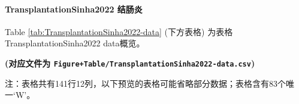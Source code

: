 \documentclass[
]{article}
\begin{document}
\hypertarget{transplantationsinha2022-ux7ed3ux80a0ux708e}{%
\paragraph{TransplantationSinha2022 结肠炎}\label{transplantationsinha2022-ux7ed3ux80a0ux708e}}

Table \ref{tab:TransplantationSinha2022-data} (下方表格) 为表格TransplantationSinha2022 data概览。

\textbf{(对应文件为 \texttt{Figure+Table/TransplantationSinha2022-data.csv})}

\begin{center}\begin{tcolorbox}[colback=gray!10, colframe=gray!50, width=0.9\linewidth, arc=1mm, boxrule=0.5pt]注：表格共有141行12列，以下预览的表格可能省略部分数据；表格含有83个唯一`W'。
\end{tcolorbox}
\end{center}
\end{document}
